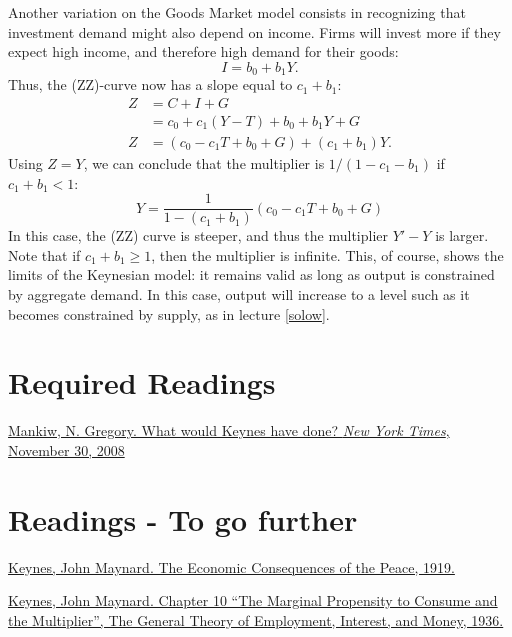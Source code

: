 \documentclass[]{book}
\begin{document}
Another variation on the Goods Market model consists in recognizing that
investment demand might also depend on income. Firms will invest more if
they expect high income, and therefore high demand for their goods:
\[I=b_{0}+b_{1}Y.\] Thus, the (ZZ)-curve now has a slope equal to
\(c_1+b_1\): \[
\begin{aligned}
Z   &=C+I+G\\
    &=c_{0}+c_{1}\left(Y-T\right)+b_{0}+b_{1}Y+G\\
Z   &=\left(c_{0}-c_{1}T+b_{0}+G\right)+\left(c_{1}+b_{1}\right)Y.
\end{aligned}
\] Using \(Z=Y\), we can conclude that the multiplier is
\(1/(1-c_1-b_1)\) if \(c_{1}+b_{1}<1\):
\[Y=\frac{1}{1-\left(c_{1}+b_{1}\right)}\left(c_{0}-c_{1}T+b_{0}+G\right)\]
In this case, the (ZZ) curve is steeper, and thus the multiplier
\(Y'-Y\) is larger. Note that if \(c_{1}+b_{1}\geq1\), then the
multiplier is infinite. This, of course, shows the limits of the
Keynesian model: it remains valid as long as output is constrained by
aggregate demand. In this case, output will increase to a level such as
it becomes constrained by supply, as in lecture \ref{solow}.

\section*{Required Readings}\label{required-readings}

\href{https://search.proquest.com/docview/433963341/fulltext/43832006CCFE4D96PQ/1?accountid=14512}{Mankiw,
N. Gregory. What would Keynes have done? \emph{New York Times}, November
30, 2008}

\section*{Readings - To go further}\label{readings---to-go-further-6}

\href{https://socialsciences.mcmaster.ca/econ/ugcm/3ll3/keynes/pdf\%26filename\%3Dpeace3.pdf}{Keynes,
John Maynard. The Economic Consequences of the Peace, 1919.}

\href{https://cas2.umkc.edu/economics/people/facultypages/kregel/courses/econ645/winter2011/generaltheory.pdf}{Keynes,
John Maynard. Chapter 10 ``The Marginal Propensity to Consume and the
Multiplier'', The General Theory of Employment, Interest, and Money,
1936.}
\end{document}

